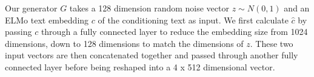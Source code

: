 Our generator $G$ takes a 128 dimension random noise vector $z \sim N(0, 1)$ and an ELMo text embedding $c$ of the conditioning text as input. We first calculate $\hat{c}$ by passing $c$ through a fully connected layer to reduce the embedding size from 1024 dimensions, down to 128 dimensions to match the dimensions of $z$. These two input vectors are then concatenated together and passed through another fully connected layer before being reshaped into a 4 x 512 dimensional vector.